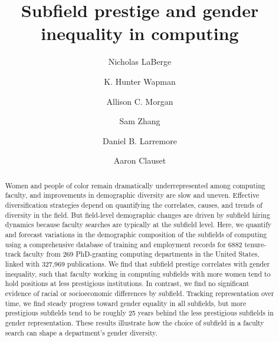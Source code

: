 \documentclass[reprint, twocolumn, aps, nofootinbib, superscriptaddress, longbibliography]{revtex4-1}
\begin{document}
\title{Subfield prestige and gender inequality in computing}

\author{Nicholas LaBerge}

\author{K. Hunter Wapman}
    
 \author{Allison C. Morgan}
    
\author{Sam Zhang}

 \author{Daniel B. Larremore}

 \author{Aaron Clauset}



\begin{abstract}
Women and people of color remain dramatically underrepresented among computing faculty, and improvements in demographic diversity are slow and uneven. Effective diversification strategies depend on quantifying the correlates, causes, and trends of diversity in the field. But field-level demographic changes are driven by subfield hiring dynamics because faculty searches are typically at the subfield level. Here, we quantify and forecast variations in the demographic composition of the subfields of computing using a comprehensive database of training and employment records for 6882 tenure-track faculty from 269 PhD-granting computing departments in the United States, linked with 327,969 publications. We find that subfield prestige correlates with gender inequality, such that faculty working in computing subfields with more women tend to hold positions at less prestigious institutions.  In contrast, we find no significant evidence of racial or socioeconomic differences by subfield. Tracking representation over time, we find steady progress toward gender equality in all subfields, but more prestigious subfields tend to be roughly 25 years behind the less prestigious subfields in gender representation.  These results illustrate how the choice of subfield in a faculty search can shape a department's gender diversity.
\end{abstract}
\end{document}
